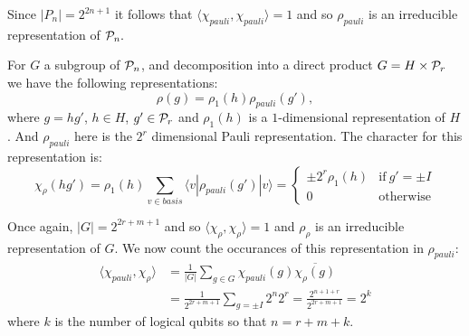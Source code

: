 \documentclass[12pt,notitlepage,longbibliography,nofootinbib,tightenlines]{revtex4}
\begin{document}
Since $|P_n|=2^{2n+1}$ it follows that
$\langle\chi_{pauli},\chi_{pauli}\rangle = 1$ and
so $\rho_{pauli}$ is an irreducible representation of $\mathcal{P}_n.$

For $G$ a subgroup of $\mathcal{P}_n$, and decomposition
into a direct product $G=H\times \mathcal{P}_r$ we have the
following representations:
$$
    \rho(g) = \rho_1(h) \rho_{pauli}(g'),
$$
where $g=hg'$, $h\in H$, $g'\in \mathcal{P}_r$ and $\rho_1(h)$ is
a $1$-dimensional representation of $H$.
And $\rho_{pauli}$ here is the $2^r$ dimensional Pauli representation.
The character for this representation is:
$$
\chi_{{\rho}}(hg') = \rho_1(h) \sum_{v \in basis} \langle v | \rho_{{pauli}}(g') | v \rangle
    = \left\{ \begin{array}{ll}
 \pm 2^r\rho_1(h) &\mbox{if}\ g'=\pm I\\
 0 &\mbox{otherwise}\end{array}\right.
$$

Once again, $|G|=2^{2r+m+1}$ and so
$\langle\chi_{\rho},\chi_{\rho}\rangle = 1$ and
$\rho_{\rho}$ is an irreducible representation of $G.$
We now count the occurances of 
this representation in $\rho_{pauli}$:
\begin{align*}
\langle\chi_{pauli},\chi_{\rho}\rangle &= \frac{1}{|G|}\sum_{g\in G} \chi_{pauli}(g)\overline{\chi_{\rho}(g)} \\
&= \frac{1}{2^{2r+m+1}} \sum_{g=\pm I} 2^n 2^r = \frac{2^{n+1+r}}{2^{2r+m+1}} = 2^k
\end{align*}
where $k$ is the number of logical qubits so that $n=r+m+k.$

{}

\end{document}
